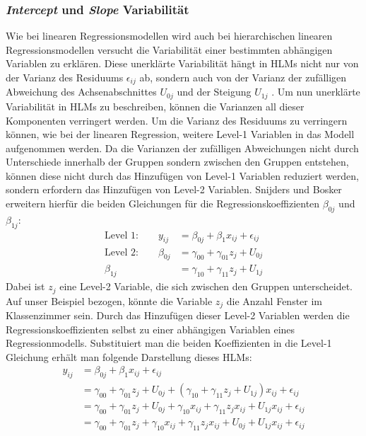 \documentclass[12pt]{article}\usepackage[]{graphicx}\usepackage[]{color}
\begin{document}
\subsubsection{\textit{Intercept} und \textit{Slope} Variabilität} \label{section:variability}
Wie bei linearen Regressionsmodellen wird auch bei hierarchischen linearen Regressionsmodellen versucht die Variabilität einer bestimmten abhängigen Variablen zu erklären. Diese unerklärte Variabilität hängt in HLMs nicht nur von der Varianz des Residuums $\epsilon_{ij}$ ab, sondern auch von der Varianz der zufälligen Abweichung des Achsenabschnittes $U_{0j}$ und der Steigung $U_{1j}$ \citep{SnijdersTomA.B2012Ma:a}. Um nun unerklärte Variabilität in HLMs zu beschreiben, können die Varianzen all dieser Komponenten verringert werden. Um die Varianz des Residuums zu verringern können, wie bei der linearen Regression, weitere Level-1 Variablen in das Modell aufgenommen werden. Da die Varianzen der zufälligen Abweichungen nicht durch Unterschiede innerhalb der Gruppen sondern zwischen den Gruppen entstehen, können diese nicht durch das Hinzufügen von Level-1 Variablen reduziert werden, sondern erfordern das Hinzufügen von Level-2 Variablen. Snijders und Bosker \citeyearpar{SnijdersTomA.B2012Ma:a} erweitern hierfür die beiden Gleichungen für die Regressionskoeffizienten $\beta_{0j}$ und $\beta_{1j}$:
\begin{equation} \label{eq:variance}
\begin{split}	
 \text{Level 1:}  \qquad y_{ij} & = \beta_{0j} + \beta_{1}x_{ij} + \epsilon_{ij}\\
 \text{Level 2:} \qquad \beta_{0j} & = \gamma_{00} + \gamma_{01}z_{j} + U_{0j}\\
 \beta_{1j} & = \gamma_{10} + \gamma_{11}z_{j} + U_{1j}
\end{split}	
\end{equation}
Dabei ist $z_{j}$ eine Level-2 Variable, die sich zwischen den Gruppen unterscheidet. Auf unser Beispiel bezogen, könnte die Variable $z_{j}$ die Anzahl Fenster im Klassenzimmer sein. Durch das Hinzufügen dieser Level-2 Variablen werden die Regressionskoeffizienten selbst zu einer abhängigen Variablen eines Regressionmodells. Substituiert man die beiden Koeffizienten in die Level-1 Gleichung erhält man folgende Darstellung dieses HLMs:
\begin{equation} \label{eq:flat_variance}
\begin{split}	
y_{ij} & = \beta_{0j} + \beta_{1}x_{ij} + \epsilon_{ij}\\
& = \gamma_{00} + \gamma_{01}z_{j} + U_{0j} + (\gamma_{10} + \gamma_{11}z_{j} + U_{1j})x_{ij} + \epsilon_{ij}\\
& = \gamma_{00} + \gamma_{01}z_{j} + U_{0j} + \gamma_{10}x_{ij} + \gamma_{11}z_{j}x_{ij} + U_{1j}x_{ij} + \epsilon_{ij}\\
& = \gamma_{00} + \gamma_{01}z_{j} + \gamma_{10}x_{ij} + \gamma_{11}z_{j}x_{ij} + U_{0j} + U_{1j}x_{ij} + \epsilon_{ij}\\
\end{split}	
\end{equation} 
\end{document}
